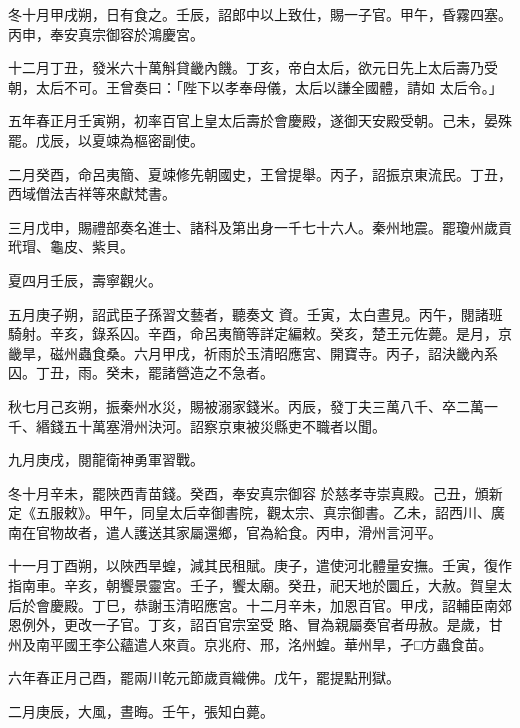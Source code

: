 \begin{pinyinscope}
 冬十月甲戌朔，日有食之。壬辰，詔郎中以上致仕，賜一子官。甲午，昏霧四塞。丙申，奉安真宗御容於鴻慶宮。



 十二月丁丑，發米六十萬斛貸畿內饑。丁亥，帝白太后，欲元日先上太后壽乃受朝，太后不可。王曾奏曰：「陛下以孝奉母儀，太后以謙全國體，請如
 太后令。」



 五年春正月壬寅朔，初率百官上皇太后壽於會慶殿，遂御天安殿受朝。己未，晏殊罷。戊辰，以夏竦為樞密副使。



 二月癸酉，命呂夷簡、夏竦修先朝國史，王曾提舉。丙子，詔振京東流民。丁丑，西域僧法吉祥等來獻梵書。



 三月戊申，賜禮部奏名進士、諸科及第出身一千七十六人。秦州地震。罷瓊州歲貢玳瑁、龜皮、紫貝。



 夏四月壬辰，壽寧觀火。



 五月庚子朔，詔武臣子孫習文藝者，聽奏文
 資。壬寅，太白晝見。丙午，閱諸班騎射。辛亥，錄系囚。辛酉，命呂夷簡等詳定編敕。癸亥，楚王元佐薨。是月，京畿旱，磁州蟲食桑。六月甲戌，祈雨於玉清昭應宮、開寶寺。丙子，詔決畿內系囚。丁丑，雨。癸未，罷諸營造之不急者。



 秋七月己亥朔，振秦州水災，賜被溺家錢米。丙辰，發丁夫三萬八千、卒二萬一千、緡錢五十萬塞滑州決河。詔察京東被災縣吏不職者以聞。



 九月庚戌，閱龍衛神勇軍習戰。



 冬十月辛未，罷陜西青苗錢。癸酉，奉安真宗御容
 於慈孝寺崇真殿。己丑，頒新定《五服敕》。甲午，同皇太后幸御書院，觀太宗、真宗御書。乙未，詔西川、廣南在官物故者，遣人護送其家屬還鄉，官為給食。丙申，滑州言河平。



 十一月丁酉朔，以陜西旱蝗，減其民租賦。庚子，遣使河北體量安撫。壬寅，復作指南車。辛亥，朝饗景靈宮。壬子，饗太廟。癸丑，祀天地於圜丘，大赦。賀皇太后於會慶殿。丁巳，恭謝玉清昭應宮。十二月辛未，加恩百官。甲戌，詔輔臣南郊恩例外，更改一子官。丁亥，詔百官宗室受
 賂、冒為親屬奏官者毋赦。是歲，甘州及南平國王李公蘊遣人來貢。京兆府、邢，洺州蝗。華州旱，孑□方蟲食苗。



 六年春正月己酉，罷兩川乾元節歲貢織佛。戊午，罷提點刑獄。



 二月庚辰，大風，晝晦。壬午，張知白薨。




\end{pinyinscope}
